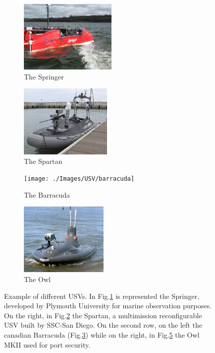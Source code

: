 \documentclass[12pt]{article}
\begin{document}
      \begin{figure}
            \centering

            \begin{subfigure}[b]{.40\linewidth}
            \includegraphics[width=\linewidth, height= 3.5cm]{./Images/USV/springer}
            \caption{The Springer}\label{fig:springer}
            \end{subfigure}
            \begin{subfigure}[b]{.40\linewidth}
            \includegraphics[width=\linewidth, height= 3.5cm]{./Images/USV/spartan}
            \caption{The Spartan}\label{fig:spartan}
            \end{subfigure}

            \begin{subfigure}[b]{.40\linewidth}
            \texttt{[image: ./Images/USV/barracuda]}
            \caption{The Barracuda}\label{fig:barracuda}
            \end{subfigure}
            \begin{subfigure}[b]{.40\linewidth}
            \includegraphics[width=\linewidth, height= 3.5cm]{./Images/USV/owl_mk2}
            \caption{The Owl}\label{fig:owl}
            \end{subfigure}
            \caption{Example of different USVs. In Fig.\ref{fig:springer} is represented the Springer, developed by Plymouth University for marine observation purposes. On the right, in Fig.\ref{fig:spartan} the Spartan, a multi\-mission reconfigurable USV built by SSC-San Diego. On the second row, on the left the canadian Barracuda (Fig.\ref{fig:barracuda}) while on the right, in Fig.\ref{fig:owl} the Owl MKII used for port security.}
      \end{figure}
\end{document}

